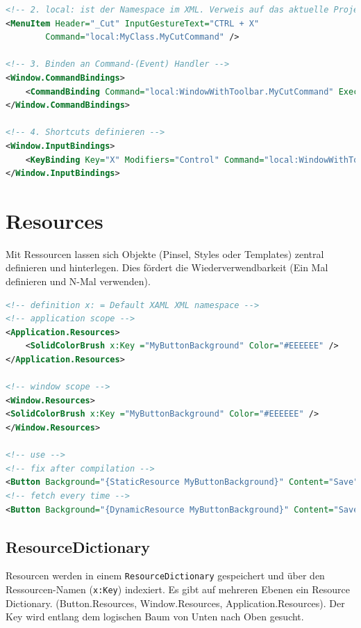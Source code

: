 \begin{lstlisting}[caption=Commands, language=XML]
<!-- 2. local: ist der Namespace im XML. Verweis auf das aktuelle Projekt -->
<MenuItem Header="_Cut" InputGestureText="CTRL + X"
		Command="local:MyClass.MyCutCommand" />
	
<!-- 3. Binden an Command-(Event) Handler -->	
<Window.CommandBindings>
	<CommandBinding Command="local:WindowWithToolbar.MyCutCommand" Executed="MyCutCommand_Executed" />
</Window.CommandBindings>

<!-- 4. Shortcuts definieren -->
<Window.InputBindings>
	<KeyBinding Key="X" Modifiers="Control" Command="local:WindowWithToolbar.MyCutCommand" />
</Window.InputBindings>
\end{lstlisting}


\section{Resources}
Mit Ressourcen lassen sich Objekte (Pinsel, Styles oder Templates) zentral definieren und hinterlegen. Dies fördert die Wiederverwendbarkeit (Ein Mal definieren und N-Mal verwenden).

\begin{lstlisting}[caption=Resources, language=XML]
<!-- definition x: = Default XAML XML namespace -->
<!-- application scope -->
<Application.Resources>
	<SolidColorBrush x:Key ="MyButtonBackground" Color="#EEEEEE" />
</Application.Resources>

<!-- window scope -->
<Window.Resources>
<SolidColorBrush x:Key ="MyButtonBackground" Color="#EEEEEE" />
</Window.Resources>

<!-- use -->
<!-- fix after compilation -->
<Button Background="{StaticResource MyButtonBackground}" Content="Save" /> 
<!-- fetch every time -->
<Button Background="{DynamicResource MyButtonBackground}" Content="Save" /> 
\end{lstlisting}

\subsection{ResourceDictionary}
Resourcen werden in einem \lstinline|ResourceDictionary| gespeichert und über den Ressourcen-Namen (\lstinline|x:Key|) indexiert. Es gibt auf mehreren Ebenen ein Resource Dictionary. (Button.Resources, Window.Resources, Application.Resources). Der Key wird entlang dem logischen Baum von Unten nach Oben gesucht. 

